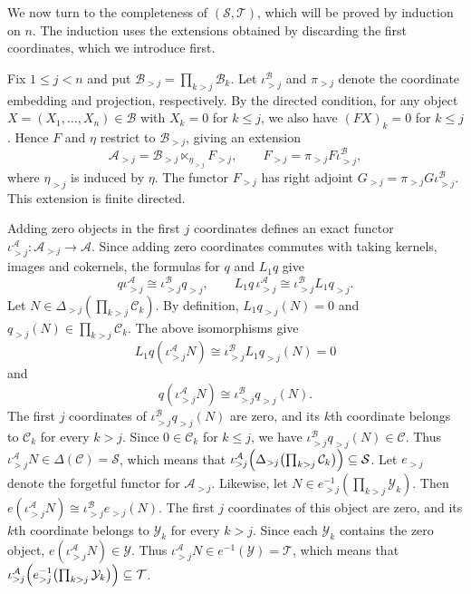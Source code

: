 \documentclass[11pt]{amsart}
\theoremstyle{definition}
\theoremstyle{remark}
\theoremstyle{plain}
\numberwithin{equation}{section}
\begin{document}
We now turn to the completeness of $(\mathcal{S},\mathcal{T})$, which will be proved
by induction on $n$. The induction uses the extensions obtained by
discarding the first coordinates, which we introduce first.

Fix $1\leq j<n$ and put
$\mathcal{B}_{>j}=\prod_{k>j}\mathcal{B}_k$.
Let $\iota^{\mathcal{B}}_{>j}$ and $\pi_{>j}$ denote the coordinate embedding and projection, respectively. By the directed condition, for any object
$X=(X_1,\ldots,X_n)\in\mathcal{B}$ with $X_k=0$ for $k\leq j$, we also have $(FX)_k=0$ for $k\leq j$. Hence $F$ and $\eta$ restrict to $\mathcal{B}_{>j}$, giving an extension
\[
\mathcal{A}_{>j}
=\mathcal{B}_{>j}\ltimes_{\eta_{>j}}F_{>j},
\qquad
F_{>j}=\pi_{>j}F\iota^{\mathcal{B}}_{>j},
\]
where $\eta_{>j}$ is induced by $\eta$.
The functor $F_{>j}$ has right adjoint
$G_{>j}=\pi_{>j}G\iota^{\mathcal{B}}_{>j}$.
This extension is finite directed.

Adding zero objects in the first $j$ coordinates defines an exact functor
$\iota^{\mathcal{A}}_{>j}:\mathcal{A}_{>j}\to\mathcal{A}$.
Since adding zero coordinates commutes with taking kernels, images and cokernels, the formulas for $q$ and $L_1q$ give
\[
q\iota^{\mathcal{A}}_{>j}
\cong\iota^{\mathcal{B}}_{>j}q_{>j},
\qquad
L_1q\,\iota^{\mathcal{A}}_{>j}
\cong\iota^{\mathcal{B}}_{>j}L_1q_{>j}.
\]
Let
$N\in\Delta_{>j}(\prod_{k>j}\mathcal{C}_k)$.
By definition, $L_1q_{>j}(N)=0$ and
$q_{>j}(N)\in\prod_{k>j}\mathcal{C}_k$.
The above isomorphisms give
\[
L_1q(\iota^{\mathcal{A}}_{>j}N)
\cong\iota^{\mathcal{B}}_{>j}L_1q_{>j}(N)=0
\]
and
\[
q(\iota^{\mathcal{A}}_{>j}N)
\cong\iota^{\mathcal{B}}_{>j}q_{>j}(N).
\]
The first $j$ coordinates of
$\iota^{\mathcal{B}}_{>j}q_{>j}(N)$ are zero, and its $k$th coordinate belongs to $\mathcal{C}_k$ for every $k>j$. Since $0\in\mathcal{C}_k$ for $k\leq j$, we have
$\iota^{\mathcal{B}}_{>j}q_{>j}(N)\in\mathcal{C}$. Thus $\iota^{\mathcal{A}}_{>j}N\in
\Delta(\mathcal{C})=\mathcal{S}$, which means that $\iota^{\mathcal{A}}_{>j}
\Bigl(\Delta_{>j}\bigl(\prod_{k>j}\mathcal{C}_k\bigr)\Bigr) \subseteq\mathcal{S}$. Let  $e_{>j}$ denote the forgetful functor for $\mathcal{A}_{>j}$. Likewise, let
$N\in e_{>j}^{-1}(\prod_{k>j}\mathcal{Y}_k)$.
Then $e(\iota^{\mathcal{A}}_{>j}N)
\cong\iota^{\mathcal{B}}_{>j}e_{>j}(N)$.
The first $j$ coordinates of this object are zero, and its $k$th coordinate belongs to $\mathcal{Y}_k$ for every $k>j$. Since each $\mathcal{Y}_k$ contains the zero object,
$e(\iota^{\mathcal{A}}_{>j}N)\in\mathcal{Y}$.
Thus $\iota^{\mathcal{A}}_{>j}N\in
e^{-1}(\mathcal{Y})=\mathcal{T}$, which means that $\iota^{\mathcal{A}}_{>j} \Bigl(e_{>j}^{-1}\bigl(\prod_{k>j}\mathcal{Y}_k\bigr)\Bigr) \subseteq\mathcal{T}$.
\end{document}
